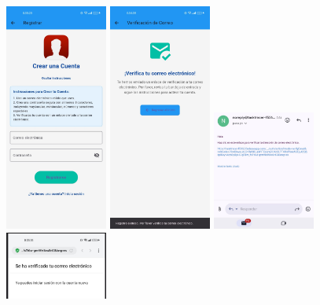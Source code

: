 \documentclass{article}
\begin{document}
\begin{flushleft}
\begin{figure}[H]
  \includegraphics[width=0.3\textwidth]{TFG/img/img/registar1.jpeg}
  \includegraphics[width=0.3\textwidth]{TFG/img/img/verificacion pantalla.jpeg}
  \includegraphics[width=0.3\textwidth]{TFG/img/img/correo.jpeg}
      \includegraphics[width=0.3\textwidth]{TFG/img/img/verificacio.png}


\end{figure}
\end{flushleft}
\end{document}
